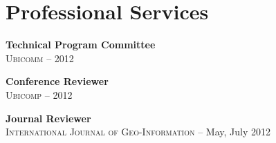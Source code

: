 \section{\sc Professional Services}
{\bf Technical Program Committee}\\
\textsc{Ubicomm} -- 2012

{\bf Conference Reviewer}\\
\textsc{Ubicomp} -- 2012

{\bf Journal Reviewer}\\
\textsc{International Journal of Geo-Information} -- May, July 2012

